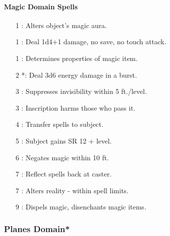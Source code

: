 \paragraph{Magic Domain Spells}
\begin{itemize}
\item[1] : Alters object's magic aura.
\item[1] : Deal 1d4+1 damage, no save, no touch attack.
\item[1] : Determines properties of magic item.
\item[2] *: Deal 3d6 energy damage in a burst.
\item[3] : Suppresses invisibility within 5 ft./level.
\item[3] : Inscription harms those who pass it.
\item[4] : Transfer spells to subject.
\item[5] : Subject gains SR 12 + level.
\item[6] : Negates magic within 10 ft.
\item[7] : Reflect spells back at caster.
\item[7] : Alters reality - within spell limits.
\item[9] : Dispels magic, disenchants magic items.
\end{itemize}
\subsubsection[Planes Domain]{Planes Domain*}
